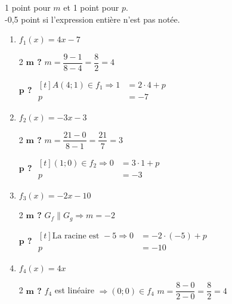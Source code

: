 \documentclass[a4paper, 12pt, parskip=half-]{scrartcl}
\begin{document}
\begin{solution}
    1 point pour $m$ et 1 point pour $p$.\\
    -0,5 point si l'expression entière n'est pas notée.
    \raggedcolumns
    \begin{enumerate}
        \item $f_1(x) = 4x-7$

              \begin{multicols}{2}
                  \textbf{$\bm{m}$ ?}
                  \medbreak
                  $m=\dfrac{9-1}{8-4}=\dfrac{8}{2}=4$

                  \textbf{$\bm{p}$ ?}
                  \medbreak
                  $\begin{aligned}[t]
                          A(4;1)\in f_1 \Rightarrow 1 & = 2\cdot 4 + p \\
                          p                           & = -7
                      \end{aligned}$
              \end{multicols}
        \item $f_2(x) = -3x-3$
              \begin{multicols}{2}
                  \textbf{$\bm{m}$ ?}
                  \medbreak
                  $m=\dfrac{21-0}{8-1}=\dfrac{21}{7}=3$

                  \textbf{$\bm{p}$ ?}
                  \medbreak
                  $\begin{aligned}[t]
                          (1;0)\in f_2 \Rightarrow 0 & = 3\cdot 1 + p \\
                          p                             & = -3
                      \end{aligned}$
              \end{multicols}
        \item $f_3(x) = -2x - 10$
              \begin{multicols}{2}
                  \textbf{$\bm{m}$ ?}
                  \medbreak
                  $G_f \parallel G_g \Rightarrow m = -2$
                  \columnbreak

                  \textbf{$\bm{p}$ ?}
                  \medbreak
                  $\begin{aligned}[t]
                          \text{La racine est }-5\Rightarrow 0 & = -2\cdot (-5) + p \\
                          p                                    & = -10
                      \end{aligned}$
              \end{multicols}
        \item $f_4(x) = 4x$
              \begin{multicols}{2}
                  \textbf{$\bm{m}$ ?}
                  \medbreak
                  $f_4$ est linéaire $\Rightarrow (0;0) \in f_4$
                  \medbreak
                  $m = \dfrac{8-0}{2-0} = \dfrac{8}{2} = 4$
                  \columnbreak


\end{multicols}
\end{enumerate}
\end{solution}
\end{document}
